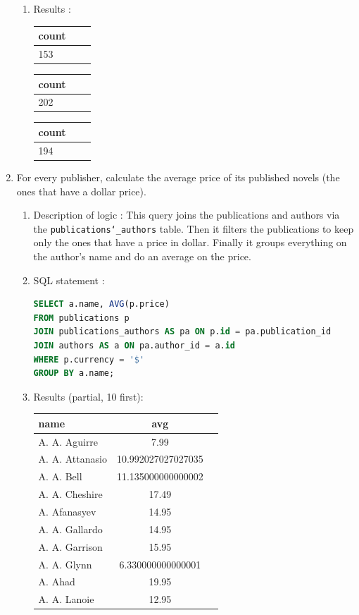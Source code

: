 \documentclass[doubleside, titlepage]{article}
\begin{document}
\begin{enumerate}
\begin{enumerate}
	\item Results :\\

	\begin{tabular}{|l|c|r|}
	  \hline
		count \\
	  \hline
		153\\
	  \hline
	\end{tabular}

	\begin{tabular}{|l|c|r|}
	  \hline
		count \\
	  \hline
		202\\
	  \hline
	\end{tabular}

	\begin{tabular}{|l|c|r|}
	  \hline
		count \\
	  \hline
		194\\
	  \hline
	\end{tabular}

\end{enumerate}

\item For every publisher, calculate the average price of its published novels (the ones that have a dollar price).

	\begin{enumerate}
	\item Description of logic : This query joins the publications and authors via the \texttt{publications\char`_authors} table. Then it filters the publications to keep only the ones that have a price in dollar. Finally it groups everything on the author’s name and do an average on the price.
	\item SQL statement :
		\begin{lstlisting}[language=SQL,showspaces=false,basicstyle=\ttfamily,numberstyle=\tiny,commentstyle=\color{gray}]
SELECT a.name, AVG(p.price)
FROM publications p
JOIN publications_authors AS pa ON p.id = pa.publication_id
JOIN authors AS a ON pa.author_id = a.id
WHERE p.currency = '$'
GROUP BY a.name;
		\end{lstlisting}

	\item Results (partial, 10 first):\\

	\begin{tabular}{|l|c|r|}
	  \hline
		  name & avg \\
	  \hline
			A. A. Aguirre & 7.99\\
			A. A. Attanasio	& 10.992027027027035\\
			A. A. Bell	& 11.135000000000002\\
			A. A. Cheshire	& 17.49\\
			A. Afanasyev	& 14.95\\
			A. A. Gallardo	& 14.95\\
			A. A. Garrison	& 15.95\\
			A. A. Glynn	& 6.330000000000001\\
			A. Ahad	& 19.95\\
			A. A. Lanoie	& 12.95\\
	  \hline
\end{tabular}


\end{enumerate}
\end{enumerate}
\end{document}
